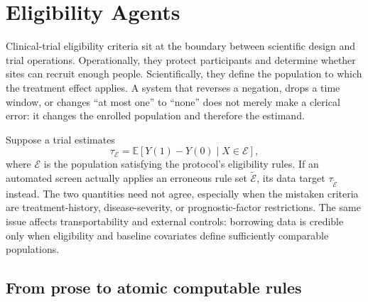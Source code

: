 \documentclass[12pt,oneside]{book}
\numberwithin{equation}{section}
\theoremstyle{definition}
\theoremstyle{plain}
\theoremstyle{remark}
\newcommand{\E}{\mathbb{E}}
\begin{document}
\section{Eligibility Agents}

Clinical-trial eligibility criteria sit at the boundary between scientific
design and trial operations.  Operationally, they protect participants and
determine whether sites can recruit enough people.  Scientifically, they define
the population to which the treatment effect applies.  A system that reverses
a negation, drops a time window, or changes ``at most one'' to ``none'' does not
merely make a clerical error: it changes the enrolled population and therefore
the estimand.

Suppose a trial estimates
\[
    \tau_{\mathcal E}
      = \E\!\left[Y(1)-Y(0)\mid X\in\mathcal E\right],
\]
where $\mathcal E$ is the population satisfying the protocol's eligibility
rules.  If an automated screen actually applies an erroneous rule set
$\widetilde{\mathcal E}$, its data target
$\tau_{\widetilde{\mathcal E}}$ instead.  The two quantities need not agree,
especially when the mistaken criteria are treatment-history, disease-severity,
or prognostic-factor restrictions.  The same issue affects transportability
and external controls: borrowing data is credible only when eligibility and
baseline covariates define sufficiently comparable populations.

\subsection{From prose to atomic computable rules}
\end{document}
